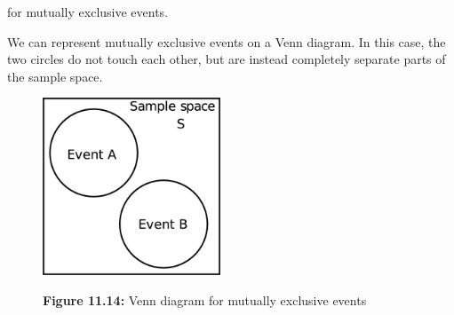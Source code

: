       \label{m39377*id114906}for mutually exclusive events.\par 
\label{m39377*eip-366}We can represent mutually exclusive events on a Venn diagram. In this case, the two circles do not touch each other, but are instead completely separate parts of the sample space.
    \setcounter{subfigure}{0}
	\begin{figure}[H] %
    \begin{center}
    \label{m39377*id6899!!!underscore!!!media}\label{m39377*id6899!!!underscore!!!printimage}\includegraphics[width=200px]{col11306.imgs/m39377_mutualexclusive.png} %
      \vspace{2pt}
    \vspace{\rubberspace}\par \begin{cnxcaption}
	  \small \textbf{Figure 11.14: }Venn diagram for mutually exclusive events
	\end{cnxcaption}
    \vspace{.1in}
    \end{center}
 \end{figure}       
\par \label{m39377*secfhsst!!!underscore!!!id1048}
